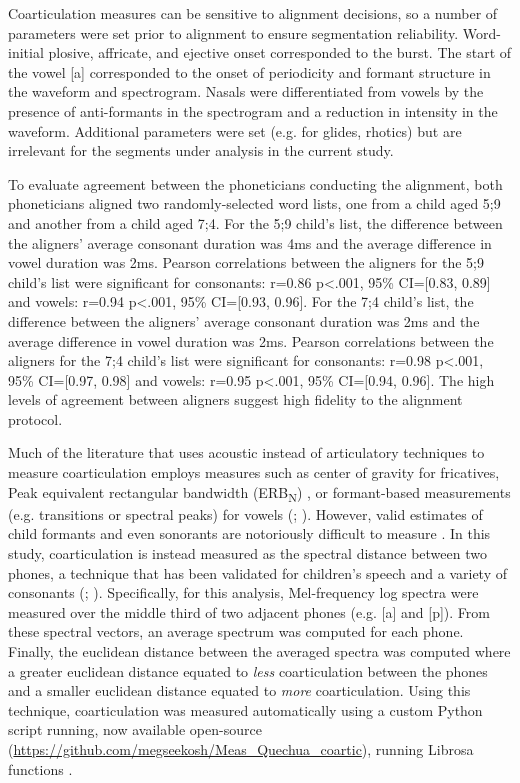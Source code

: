 \documentclass[a4paper,man,floatsintext,natbib,donotrepeattitle, apacite]{apa6}
\begin{document}
Coarticulation measures can be sensitive to alignment decisions, so a number of parameters were set prior to alignment to ensure segmentation reliability. Word-initial plosive, affricate, and ejective onset corresponded to the burst. The start of the vowel [a] corresponded to the onset of periodicity and formant structure in the waveform and spectrogram. Nasals were differentiated from vowels by the presence of anti-formants in the spectrogram and a reduction in intensity in the waveform. Additional parameters were set (e.g. for glides, rhotics) but are irrelevant for the segments under analysis in the current study. 

To evaluate agreement between the phoneticians conducting the alignment, both phoneticians aligned two randomly-selected word lists, one from a child aged 5;9 and another from a child aged 7;4. For the 5;9 child's list, the difference between the aligners’ average consonant duration was 4ms and the average difference in vowel duration was 2ms. Pearson correlations between the aligners for the 5;9 child's list were significant for consonants: r=0.86 p<.001, 95\% CI=[0.83, 0.89] and vowels: r=0.94 p<.001, 95\% CI=[0.93, 0.96]. For the 7;4 child's list, the difference between the aligners’ average consonant duration was 2ms and the average difference in vowel duration was 2ms. Pearson correlations between the aligners for the 7;4 child's list were significant for consonants: r=0.98 p<.001, 95\% CI=[0.97, 0.98] and vowels: r=0.95 p<.001, 95\% CI=[0.94, 0.96]. The high levels of agreement between aligners suggest high fidelity to the alignment protocol.

Much of the literature that uses acoustic instead of articulatory techniques to measure coarticulation employs measures such as center of gravity for fricatives, Peak equivalent rectangular bandwidth (ERB\textsubscript{N}) \citep{reidyAcousticsWordInitialFricatives2017}, or formant-based measurements (e.g. transitions or spectral peaks) for vowels (\citealt{lehistePerceptionCoarticulationEffects1972}; \citealt{ohmanCoarticulationVCVUtterances1966}). However, valid estimates of child formants and even sonorants are notoriously difficult to measure \citep{chenF0inducedFormantMeasurement2019}. In this study, coarticulation is instead measured as the spectral distance between two phones, a technique that has been validated for children's speech and a variety of consonants (\citealt{cychoszSpectralTemporalMeasures2019}; \citealt{gerosaAnalyzingChildrenSpeech2006}). Specifically, for this analysis, Mel-frequency log spectra were measured over the middle third of two adjacent phones (e.g. [a] and [p]). From these spectral vectors, an average spectrum was computed for each phone. Finally, the euclidean distance between the averaged spectra was computed where a greater euclidean distance equated to \textit{less} coarticulation between the phones and a smaller euclidean distance equated to \textit{more} coarticulation. Using this technique, coarticulation was measured automatically using a custom Python script running, now available open-source (\url{https://github.com/megseekosh/Meas_Quechua_coartic}), running Librosa functions \citep{mcfeeLibrosaAudioMusic2015}. 
\end{document}
